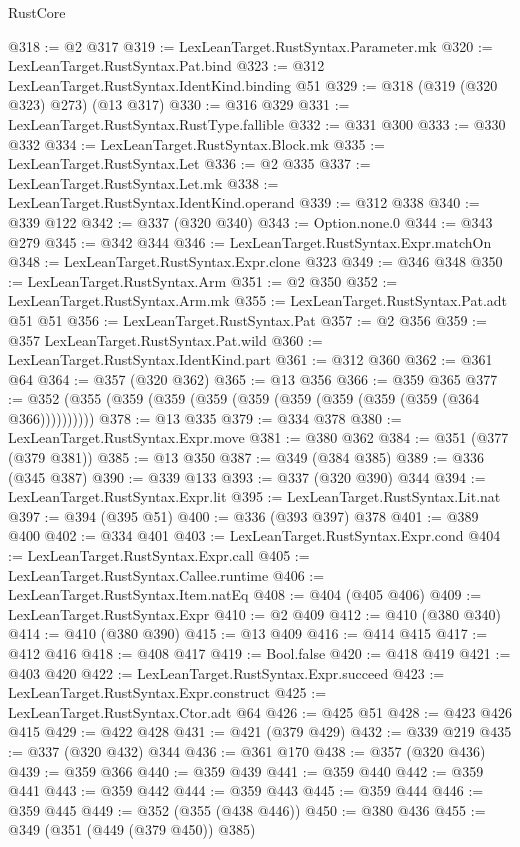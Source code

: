 \begin{lexlean}{RustCore}
\begin{coremodule}
@318 := @2 @317
@319 := LexLeanTarget.RustSyntax.Parameter.mk
@320 := LexLeanTarget.RustSyntax.Pat.bind
@323 := @312 LexLeanTarget.RustSyntax.IdentKind.binding @51
@329 := @318 (@319 (@320 @323) @273) (@13 @317)
@330 := @316 @329
@331 := LexLeanTarget.RustSyntax.RustType.fallible
@332 := @331 @300
@333 := @330 @332
@334 := LexLeanTarget.RustSyntax.Block.mk
@335 := LexLeanTarget.RustSyntax.Let
@336 := @2 @335
@337 := LexLeanTarget.RustSyntax.Let.mk
@338 := LexLeanTarget.RustSyntax.IdentKind.operand
@339 := @312 @338
@340 := @339 @122
@342 := @337 (@320 @340)
@343 := Option.none.{0}
@344 := @343 @279
@345 := @342 @344
@346 := LexLeanTarget.RustSyntax.Expr.matchOn
@348 := LexLeanTarget.RustSyntax.Expr.clone @323
@349 := @346 @348
@350 := LexLeanTarget.RustSyntax.Arm
@351 := @2 @350
@352 := LexLeanTarget.RustSyntax.Arm.mk
@355 := LexLeanTarget.RustSyntax.Pat.adt @51 @51
@356 := LexLeanTarget.RustSyntax.Pat
@357 := @2 @356
@359 := @357 LexLeanTarget.RustSyntax.Pat.wild
@360 := LexLeanTarget.RustSyntax.IdentKind.part
@361 := @312 @360
@362 := @361 @64
@364 := @357 (@320 @362)
@365 := @13 @356
@366 := @359 @365
@377 := @352 (@355 (@359 (@359 (@359 (@359 (@359 (@359 (@359 (@359 (@364 @366))))))))))
@378 := @13 @335
@379 := @334 @378
@380 := LexLeanTarget.RustSyntax.Expr.move
@381 := @380 @362
@384 := @351 (@377 (@379 @381))
@385 := @13 @350
@387 := @349 (@384 @385)
@389 := @336 (@345 @387)
@390 := @339 @133
@393 := @337 (@320 @390) @344
@394 := LexLeanTarget.RustSyntax.Expr.lit
@395 := LexLeanTarget.RustSyntax.Lit.nat
@397 := @394 (@395 @51)
@400 := @336 (@393 @397) @378
@401 := @389 @400
@402 := @334 @401
@403 := LexLeanTarget.RustSyntax.Expr.cond
@404 := LexLeanTarget.RustSyntax.Expr.call
@405 := LexLeanTarget.RustSyntax.Callee.runtime
@406 := LexLeanTarget.RustSyntax.Item.natEq
@408 := @404 (@405 @406)
@409 := LexLeanTarget.RustSyntax.Expr
@410 := @2 @409
@412 := @410 (@380 @340)
@414 := @410 (@380 @390)
@415 := @13 @409
@416 := @414 @415
@417 := @412 @416
@418 := @408 @417
@419 := Bool.false
@420 := @418 @419
@421 := @403 @420
@422 := LexLeanTarget.RustSyntax.Expr.succeed
@423 := LexLeanTarget.RustSyntax.Expr.construct
@425 := LexLeanTarget.RustSyntax.Ctor.adt @64
@426 := @425 @51
@428 := @423 @426 @415
@429 := @422 @428
@431 := @421 (@379 @429)
@432 := @339 @219
@435 := @337 (@320 @432) @344
@436 := @361 @170
@438 := @357 (@320 @436)
@439 := @359 @366
@440 := @359 @439
@441 := @359 @440
@442 := @359 @441
@443 := @359 @442
@444 := @359 @443
@445 := @359 @444
@446 := @359 @445
@449 := @352 (@355 (@438 @446))
@450 := @380 @436
@455 := @349 (@351 (@449 (@379 @450)) @385)

\end{coremodule}
\end{lexlean}
